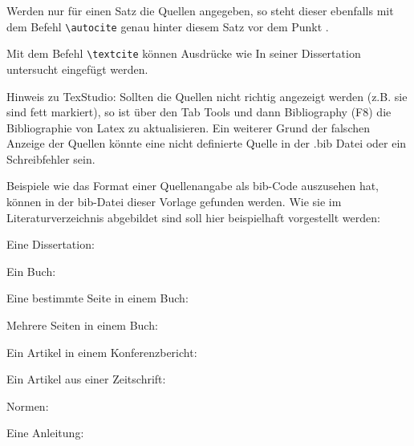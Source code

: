 Werden nur für einen Satz die Quellen angegeben, so steht dieser ebenfalls mit dem Befehl \verb|\autocite| genau hinter diesem Satz vor dem Punkt \autocite{Diss_Fottner}.

Mit dem Befehl \verb|\textcite| können Ausdrücke wie \glqq In seiner Dissertation untersucht \textcite{Diss_Fottner}\grqq{} eingefügt werden.

Hinweis zu TexStudio: Sollten die Quellen nicht richtig angezeigt werden (z.B. sie sind fett markiert), so ist über den Tab \glqq Tools\grqq{} und dann Bibliography (F8) die Bibliographie von Latex zu aktualisieren. Ein weiterer Grund der falschen Anzeige der Quellen könnte eine nicht definierte Quelle in der .bib Datei oder ein  Schreibfehler sein.
\newpage

Beispiele wie das Format einer Quellenangabe als bib-Code auszusehen hat, können in der bib-Datei dieser Vorlage gefunden werden. Wie sie im Literaturverzeichnis abgebildet sind soll hier beispielhaft vorgestellt werden:

Eine Dissertation: \autocite{Diss_Fottner}

Ein Buch: \autocite{Ewins}

Eine bestimmte Seite in einem Buch: \autocite[789]{Ewins}

Mehrere Seiten in einem Buch: \autocite[789--791]{Ewins}

Ein Artikel in einem Konferenzbericht: \autocite{Sch-2012}

Ein Artikel aus einer Zeitschrift: \autocite{Cel-1997}

Normen: \autocite{DIN15018T3,EN12999, ISO8686T1}

Eine Anleitung: \autocite{NODYA}